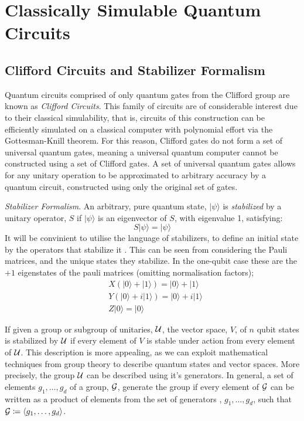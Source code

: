 \section{Classically Simulable Quantum Circuits}
\subsection{Clifford Circuits and Stabilizer Formalism}

Quantum circuits comprised of only quantum gates from the Clifford group are known as \textit{Clifford Circuits}.
This family of circuits are of considerable interest due to their classical simulability, that is,
circuits of this construction can be efficiently simulated on a classical computer with polynomial
effort via the Gottesman-Knill theorem. For this reason, Clifford gates do not form
a set of universal quantum gates, meaning a universal quantum computer cannot be constructed using a set
of Clifford gates. A set of universal quantum gates allows for any unitary operation to be approximated to
arbitrary accuracy by a quantum circuit, constructed using only the original set of gates.

\textit{Stabilizer Formalism}. An arbitrary, pure quantum state, $|\psi\rangle$ is \textit{stabilized} by
a unitary operator, $S$ if $|\psi\rangle$  is an eigenvector of $S$, with eigenvalue 1, satisfying:
\begin{equation}
    S|\psi\rangle = |\psi\rangle
\end{equation}
It will be convinient to utilise the language of stabilizers, to define an initial state by the operators that stabilize it
\cite{PhysRevA.70.052328}.
This can be seen from considering the Pauli matrices, and the unique states they stabilize. In the one-qubit case these are
the $+1$ eigenstates of the pauli matrices (omitting normalisation factors);
\begin{align}
     & X(|0\rangle + |1\rangle) = |0\rangle + |1\rangle   \\
     & Y(|0\rangle + i|1\rangle) = |0\rangle + i|1\rangle \\
     & Z|0\rangle = |0\rangle
\end{align}

If given a group or subgroup of unitaries, $\cal U$, the vector space, $V$, of $n$ qubit states is
stabilized by $\cal U$ if every element of $V$ is stable under action from every element of $\cal U$.
This description is more appealing, as we can exploit mathematical techniques from group theory to
describe quantum states and vector spaces. More precisely, the group $\cal U$ can be described using it's
generators. In general, a set of elements  $g_1, \dots, g_d$ of a group, $\cal G$, generate the group
if every element of $\cal G$ can be written as a product of elements from the set of generators \cite{Calderbank_1997},
$g_1, \dots, g_d$, such that ${\cal G} \coloneqq \langle g_1, \dots, g_d\rangle$.

